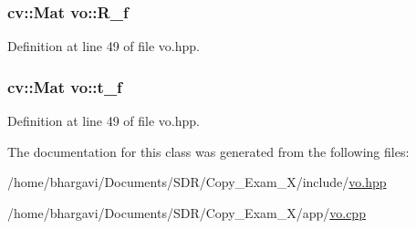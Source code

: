 \subsubsection[{\texorpdfstring{R\+\_\+f}{R_f}}]{\setlength{\rightskip}{0pt plus 5cm}cv\+::\+Mat vo\+::\+R\+\_\+f}\hypertarget{classvo_a9b0c73504e1fdcf536678755757023db}{}\label{classvo_a9b0c73504e1fdcf536678755757023db}


Definition at line 49 of file vo.\+hpp.

\subsubsection[{\texorpdfstring{t\+\_\+f}{t_f}}]{\setlength{\rightskip}{0pt plus 5cm}cv\+::\+Mat vo\+::t\+\_\+f}\hypertarget{classvo_a59a051419df095f766905047916cf7a0}{}\label{classvo_a59a051419df095f766905047916cf7a0}


Definition at line 49 of file vo.\+hpp.



The documentation for this class was generated from the following files\+:\begin{DoxyCompactItemize}
\item 
/home/bhargavi/\+Documents/\+S\+D\+R/\+Copy\+\_\+\+Exam\+\_\+X/include/\hyperlink{vo_8hpp}{vo.\+hpp}\item 
/home/bhargavi/\+Documents/\+S\+D\+R/\+Copy\+\_\+\+Exam\+\_\+X/app/\hyperlink{vo_8cpp}{vo.\+cpp}\end{DoxyCompactItemize}

